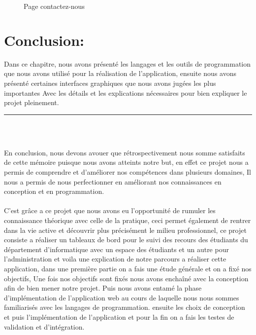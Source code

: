 \documentclass[12pt]{report}
\begin{document}
\vspace{0.2in}

\begin{figure}[h]
\centering
  \hspace*{-0.33in}
\caption{Page contactez-nous}
\end{figure}

\section{Conclusion:}
\vspace{0.1in}

Dans ce chapitre, nous avons présenté les langages et les outils de programmation que nous avons utilisé pour la réalisation de l'application, ensuite nous avons présenté certaines interfaces graphiques que nous avons jugées les plus importantes Avec les détails et les explications nécessaires pour bien expliquer le projet pleinement.

\newpage

\vspace*{-0.2in}

\begin{center}
    {\color{Blue} \rule{5.5in}{1.4mm} }\\
    \vspace{0.1in}
    \scshape{\fontsize{34}{46}{\bfseries{\color{Blue}{Conclusion générale}}}}
    \\
    \vspace{0.5in}
\end{center}

En conclusion, nous devons avouer que rétrospectivement nous somme satisfaits de cette mémoire puisque nous avons atteints notre but, en effet ce projet nous a permis de comprendre et d'améliorer nos compétences dans plusieurs domaines, Il nous a permis de nous perfectionner en améliorant nos connaissances en conception et en programmation.
\\\\
    C'est grâce a ce projet que nous avons eu l'opportunité de rumuler les connaissance théorique avec celle de la pratique, ceci permet également de rentrer dans la vie active et découvrir plus précisément le milieu professionnel, ce projet consiste a réaliser un tableaux de bord pour le suivi des recours des étudiants du département d’informatique avec un espace des étudiants et un autre pour l’administration et voila une explication de notre parcours a réaliser cette application, dans une première partie on a fais une étude générale et on a fixé nos objectifs, Une fois nos objectifs sont fixés nous avons enchaîné avec la conception afin de bien mener notre projet. Puis nous avons entamé la phase d’implémentation de l’application web au cours de laquelle nous nous sommes familiarisés avec les langages de programmation. ensuite les choix de conception et puis l'impl\'ementation de l’application et pour la fin on a fais les testes de validation et d'intégration.
\end{document}
